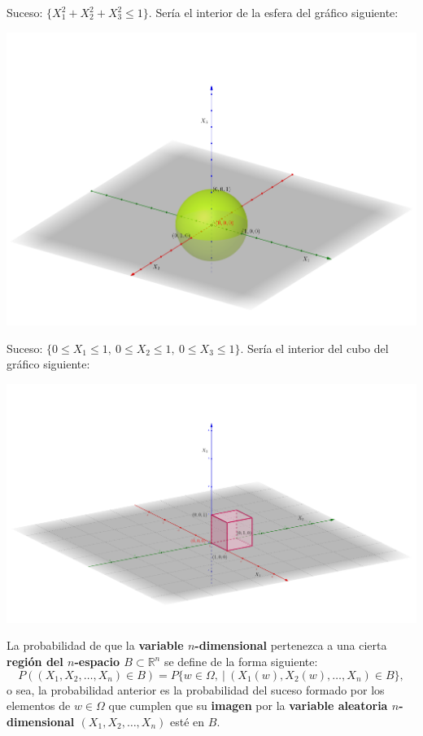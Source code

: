 \documentclass[]{book}
\begin{document}
Suceso: \(\{X_1^2+X_2^2+X_3^2\leq 1\}\). Sería el interior de la esfera del gráfico siguiente:

\includegraphics{Images/EjEsfera3D.png}

Suceso: \(\{0\leq X_1\leq 1,\ 0\leq X_2\leq 1,\ 0\leq X_3\leq 1\}\). Sería el interior del cubo del gráfico siguiente:

\includegraphics{Images/Ej3DCubo.png}

La probabilidad de que la \textbf{variable \(n\)-dimensional} pertenezca a una cierta \textbf{región del \(n\)-espacio \(B\subset \mathbb{R}^n\)} se define de la forma siguiente:
\[
P((X_1,X_2,\ldots,X_n)\in B)=P\{w\in \Omega,\ |\ (X_1(w),X_2(w),\ldots,X_n)\in B\},
\]
o sea, la probabilidad anterior es la probabilidad del suceso formado por los elementos de \(w\in\Omega\) que cumplen que su \textbf{imagen} por la \textbf{variable aleatoria \(n\)-dimensional \((X_1,X_2,\ldots,X_n)\)} esté en \(B\).
\end{document}
